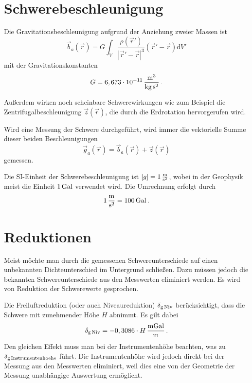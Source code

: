 \section{Schwerebeschleunigung}

Die Gravitationsbeschleunigung aufgrund der Anziehung zweier Massen ist
\begin{equation}
 \vec{b}_a(\vec{r})=G\int_V \frac{\rho(\vec{r}')}{|\vec{r}'-\vec{r}|^3}(\vec{r}'-\vec{r})\text{d}V'
\end{equation}
mit der Gravitationskonstanten
\begin{equation}
 G=6,673\cdot 10^{-11}\,\frac{\mathrm{m^3}}{\mathrm{kg\,s^2}} \text{\,.}
\end{equation}

Außerdem wirken noch scheinbare Schwerewirkungen wie zum Beispiel die Zentrifugalbeschleunigung $\vec{z}(\vec{r})$, die durch die Erdrotation hervorgerufen wird.

Wird eine Messung der Schwere durchgeführt, wird immer die vektorielle Summe dieser beiden Beschleunigungen
\begin{equation}
 \vec{g}_a(\vec{r})=\vec{b}_a(\vec{r})+\vec{z}(\vec{r})
\end{equation}
gemessen.

Die SI-Einheit der Schwerebeschleunigung ist $\left[g\right]=1\,\frac{\mathrm{m}}{\mathrm{s^2}}$, wobei in der Geophysik meist die Einheit $1\,\mathrm{Gal}$ verwendet wird. Die Umrechnung erfolgt durch
\begin{equation}
 1\,\frac{\mathrm{m}}{\mathrm{s^2}}=100\,\mathrm{Gal} \text{\,.}
\end{equation}

\section{Reduktionen}
\label{sec:Reduktionen}

Meist möchte man durch die gemessenen Schwereunterschiede auf einen unbekannten Dichteunterschied im Untergrund schließen. Dazu müssen jedoch die bekannten Schwereunterschiede aus den Messwerten eliminiert werden. Es wird von Reduktion der Schwerewerte gesprochen.

Die Freiluftreduktion (oder auch Niveaureduktion) $\delta_{\mathrm{g\,Niv}}$ berücksichtigt, dass die Schwere mit zunehmender Höhe $H$ abnimmt. Es gilt dabei
\begin{equation}
 \delta_{\mathrm{g\,Niv}}=-0,3086\cdot H\,\frac{\mathrm{mGal}}{\mathrm{m}} \text{\,.}
 \label{eq:Freiluft}
\end{equation}
Den gleichen Effekt muss man bei der Instrumentenhöhe beachten, was zu $\delta_{\mathrm{g\,Instrumentenhoehe}}$ führt. Die Instrumentenhöhe wird jedoch direkt bei der Messung aus den Messwerten eliminiert, weil dies eine von der Geometrie der Messung unabhängige Auswertung ermöglicht.

